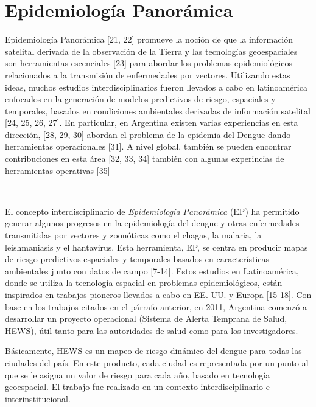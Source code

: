 



\section{Epidemiología Panorámica}

\justifying

Epidemiología Panorámica [21, 22] promueve la noción de que la información
satelital derivada de la observación de la Tierra y las tecnologías geoespaciales
son herramientas escenciales [23] para abordar los problemas epidemiológicos
relacionados a la transmisión de enfermedades por vectores. Utilizando
estas ideas, muchos estudios interdisciplinarios fueron llevados a cabo en
latinoamérica enfocados en la generación de modelos predictivos de riesgo,
espaciales y temporales, basados en condiciones ambientales derivadas de
información satelital [24, 25, 26, 27]. En particular, en Argentina
existen varias experiencias en esta dirección, [28, 29, 30] abordan el
problema de la epidemia del Dengue dando herramientas operacionales [31].
A nivel global, también se pueden encontrar contribuciones en esta área
[32, 33, 34] también con algunas experincias de herramientas operativas [35]


----------------------------------------

El concepto interdisciplinario de \textit{Epidemiología Panorámica} (EP)
ha permitido generar algunos progresos en la epidemiología del dengue y otras
enfermedades transmitidas por vectores y zoonóticas como el chagas, la
malaria, la leishmaniasis y el hantavirus. Esta herramienta, EP, se centra en
producir mapas de riesgo predictivos espaciales y temporales basados en
características ambientales junto con datos de campo [7-14].
Estos estudios en Latinoamérica, donde se utiliza la tecnología espacial en
problemas epidemiológicos, están inspirados en trabajos pioneros llevados a cabo
en EE. UU. y Europa [15-18].
Con base en los trabajos citados en el párrafo anterior, en 2011, Argentina
comenzó a desarrollar un proyecto operacional
(Sistema de Alerta Temprana de Salud, HEWS), útil tanto para las autoridades de
salud como para los investigadores.


Básicamente, HEWS es un mapeo de riesgo dinámico del dengue para todas las
ciudades del país. En este producto, cada ciudad es representada por un punto
al que se le asigna un valor de riesgo para cada año, basado en tecnología
geoespacial. El trabajo fue realizado en un contexto interdisciplinario e
interinstitucional.

